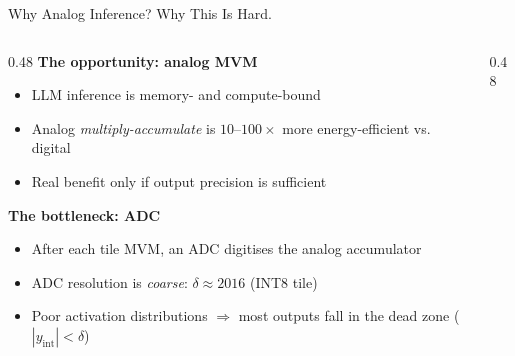 \begin{frame}[shrink=20]{Why Analog Inference? Why This Is Hard.}
  \begin{columns}[T]
    \begin{column}{0.48\textwidth}
      \textbf{The opportunity: analog MVM}
      \begin{itemize}
        \item LLM inference is memory- and compute-bound
        \item Analog \emph{multiply-accumulate} is $10\text{--}100\times$ more energy-efficient vs. digital
        \item Real benefit only if output precision is sufficient
      \end{itemize}
      \vspace{0.15em}
      \textbf{The bottleneck: ADC}
      \begin{itemize}
        \item After each tile MVM, an ADC digitises the analog accumulator
        \item ADC resolution is \emph{coarse}: $\delta \approx 2016$ (INT8 tile)
        \item Poor activation distributions $\Rightarrow$ most outputs fall in the \alert{dead zone} ($|y_\mathrm{int}| < \delta$)
      \end{itemize}
    \end{column}
    \begin{column}{0.48\textwidth}
\end{column}
\end{columns}
\end{frame}
